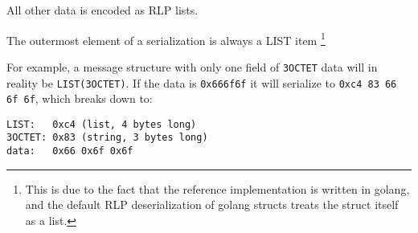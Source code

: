 All other data is encoded as RLP lists.

The outermost element of a serialization is always a LIST item%
%
\footnote{This is due to the fact that the reference implementation is written in golang, and the default RLP deserialization of golang structs treats the struct itself as a list.}

For example, a message structure with only one field of \texttt{3OCTET} data will in reality be \texttt{LIST(3OCTET)}. If  the data is \texttt{0x666f6f} it will serialize to \texttt{0xc4 83 66 6f 6f}, which breaks down to:

\begin{lstlisting}[numbers=none]
LIST:	0xc4 (list, 4 bytes long)
3OCTET:	0x83 (string, 3 bytes long)
data: 	0x66 0x6f 0x6f
\end{lstlisting}

